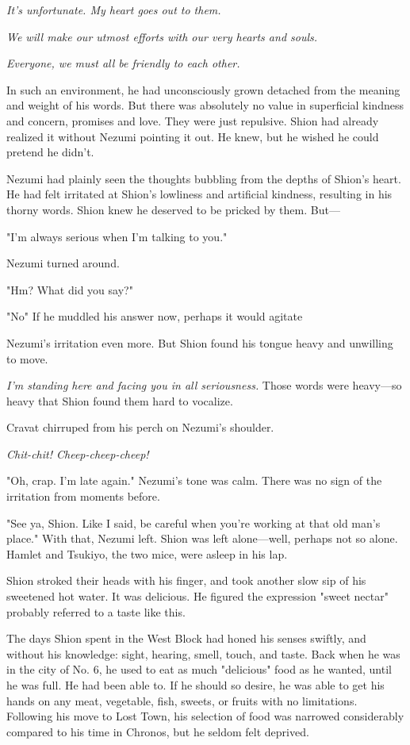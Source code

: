 \emph{It's unfortunate. My heart goes out to them.}

\emph{We will make our utmost efforts with our very hearts and souls.}

\emph{Everyone, we must all be friendly to each other.}

In such an environment, he had unconsciously grown detached from the
meaning and weight of his words. But there was absolutely no value in
superficial kindness and concern, promises and love. They were just
repulsive. Shion had already realized it without Nezumi pointing it out.
He knew, but he wished he could pretend he didn't.

Nezumi had plainly seen the thoughts bubbling from the depths of Shion's
heart. He had felt irritated at Shion's lowliness and artificial
kindness, resulting in his thorny words. Shion knew he deserved to be
pricked by them. But---

"I'm always serious when I'm talking to you."

Nezumi turned around.

"Hm? What did you say?"

"No\el " If he muddled his answer now, perhaps it would agitate~

Nezumi's irritation even more. But Shion found his tongue heavy and
unwilling to move.

\emph{I'm standing here and facing you in all seriousness.} Those words were
heavy---so heavy that Shion found them hard to vocalize.

Cravat chirruped from his perch on Nezumi's shoulder.

\emph{Chit-chit! Cheep-cheep-cheep!}

"Oh, crap. I'm late again." Nezumi's tone was calm. There was no sign of
the irritation from moments before.

"See ya, Shion. Like I said, be careful when you're working at that old
man's place." With that, Nezumi left. Shion was left alone---well, perhaps
not so alone. Hamlet and Tsukiyo, the two mice, were asleep in his lap.

Shion stroked their heads with his finger, and took another slow sip of
his sweetened hot water. It was delicious. He figured the expression
"sweet nectar" probably referred to a taste like this.

The days Shion spent in the West Block had honed his senses swiftly, and
without his knowledge: sight, hearing, smell, touch, and taste. Back
when he was in the city of No. 6, he used to eat as much "delicious"
food as he wanted, until he was full. He had been able to. If he should
so desire, he was able to get his hands on any meat, vegetable, fish,
sweets, or fruits with no limitations. Following his move to Lost Town,
his selection of food was narrowed considerably compared to his time in
Chronos, but he seldom felt deprived.

